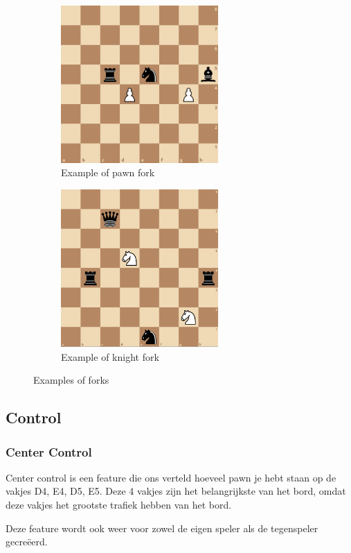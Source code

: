 \documentclass[a4paper,openany]{uantwerpenassignment}
\begin{document}
\begin{figure}[h]
    \centering
    \begin{subfigure}{.4\textwidth}
        \includegraphics[width=170pt]{images/pawnFork.png}
        \caption{Example of pawn fork}
        \label{fig:pawnFork}
    \end{subfigure}
    \begin{subfigure}{.4\textwidth}
        \includegraphics[width=170pt]{images/knightFork.png}
        \caption{Example of knight fork}
        \label{fig:knightFork}
    \end{subfigure}
    \caption{Examples of forks}
\end{figure}

\subsection{Control}
\subsubsection{Center Control}
Center control is een feature die ons verteld hoeveel pawn je hebt staan op de vakjes D4, E4, D5, E5. Deze 4 vakjes zijn het belangrijkste van het bord, omdat deze vakjes het grootste trafiek hebben van het bord.

Deze feature wordt ook weer voor zowel de eigen speler als de tegenspeler gecreëerd.
\end{document}
